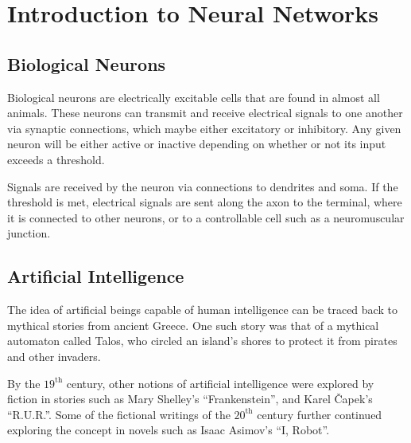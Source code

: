 \chapter{Introduction to Neural Networks}


\section{Biological Neurons}

Biological neurons are electrically excitable cells that are found in almost all
animals.
These neurons can transmit and receive electrical signals to one another via
synaptic connections, which maybe either excitatory or inhibitory.
Any given neuron will be either active or inactive depending on whether or not
its input exceeds a threshold.

\begin{center}
    
\end{center}

Signals are received by the neuron via connections to dendrites and soma.
If the threshold is met, electrical signals are sent along the axon to the
terminal, where it is connected to other neurons, or to a controllable cell such
as a neuromuscular junction.


\section{Artificial Intelligence}

The idea of artificial beings capable of human intelligence can be traced back
to mythical stories from ancient Greece.
One such story was that of a mythical automaton called Talos, who circled an
island's shores to protect it from pirates and other invaders.

By the $19^\text{th}$ century, other notions of artificial intelligence were
explored by fiction in stories such as Mary Shelley's ``Frankenstein'', and
Karel \v{C}apek's ``R.U.R.''.
Some of the fictional writings of the $20^\text{th}$ century further continued
exploring the concept in novels such as Isaac Asimov's ``I, Robot''.

